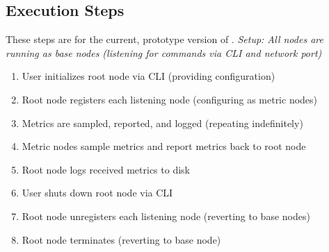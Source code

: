 \subsection{Execution Steps}

These steps are for the current, prototype version of \dcamp. \textit{Setup: All nodes are running as base nodes
(listening for commands via CLI and network port)}

\begin{enumerate}

\item User initializes root node via CLI (providing configuration) 
\item Root node registers each listening node (configuring as metric nodes) 
\item Metrics are sampled, reported, and logged (repeating indefinitely) 
\item Metric nodes sample metrics and report metrics back to root node 
\item Root node logs received metrics to disk 
\item User shuts down root node via CLI 
\item Root node unregisters each listening node (reverting to base nodes) 
\item Root node terminates (reverting to base node)

\end{enumerate}

